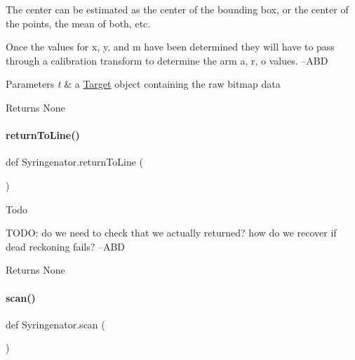 The center can be estimated as the center of the bounding box, or the center of the points, the mean of both, etc.

Once the values for x, y, and m have been determined they will have to pass through a calibration transform to determine the arm a, r, o values. --A\+BD


\begin{DoxyParams}{Parameters}
{\em t} & a \mbox{\hyperlink{classSyringenator_1_1Target}{Target}} object containing the raw bitmap data \\
\hline
\end{DoxyParams}
\begin{DoxyReturn}{Returns}
None 
\end{DoxyReturn}
\mbox{\label{namespaceSyringenator_afe04905c8a4a9d077457422866633203}} 
\paragraph{\texorpdfstring{returnToLine()}{returnToLine()}}
{\footnotesize\ttfamily def Syringenator.\+return\+To\+Line (\begin{DoxyParamCaption}{ }\end{DoxyParamCaption})}

\begin{DoxyRefDesc}{Todo}
\item[\mbox{\hyperlink{todo__todo000002}{Todo}}]T\+O\+DO\+: do we need to check that we actually returned? how do we recover if dead reckoning fails? --A\+BD \end{DoxyRefDesc}
\begin{DoxyReturn}{Returns}
None 
\end{DoxyReturn}
\mbox{\label{namespaceSyringenator_aff01237d3ff3e33f0ffc32927d813df0}} 
\paragraph{\texorpdfstring{scan()}{scan()}}
{\footnotesize\ttfamily def Syringenator.\+scan (\begin{DoxyParamCaption}{ }\end{DoxyParamCaption})}

